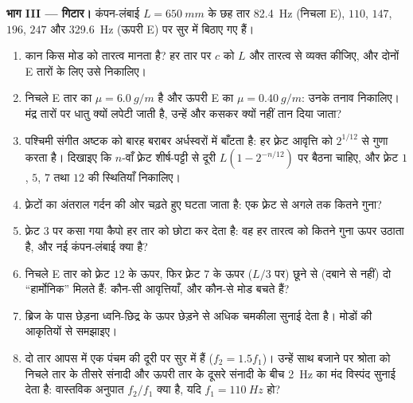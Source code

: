 \begin{problem}[{सप्ताहांत समस्या --- प्रयोग-मेज़ पर कंपित होता एक तार, एक
घिरनी और कुछ बाट, फिर एक गिटार: अर्ध-तरंगदैर्घ्यों की गिनती कैसे फ़्रेटबोर्ड
के हर स्वर को तय कर देती है}]
\medskip
\noindent\textbf{भाग III --- गिटार।}
कंपन-लंबाई $L = \qty{650}{mm}$ के छह तार
\qty{82.4}{Hz} (निचला E), $110$, $147$, $196$, $247$ और \qty{329.6}{Hz}
(ऊपरी E) पर सुर में बिठाए गए हैं।
\begin{enumerate}[resume]
  \item कान किस मोड को तारत्व मानता है? हर तार पर $c$ को $L$ और तारत्व
        से व्यक्त कीजिए, और दोनों E तारों के लिए उसे निकालिए।
  \item निचले E तार का $\mu = \qty{6.0}{g/m}$ है और ऊपरी E का
        $\mu = \qty{0.40}{g/m}$: उनके तनाव निकालिए। मंद्र तारों पर धातु
        क्यों लपेटी जाती है, उन्हें और कसकर क्यों नहीं तान दिया जाता?
  \item पश्चिमी संगीत अष्टक को बारह बराबर अर्धस्वरों में बाँटता है: हर
        फ़्रेट आवृत्ति को $2^{1/12}$ से गुणा करता है। दिखाइए कि
        $n$-वाँ फ़्रेट शीर्ष-पट्टी से दूरी $L(1 - 2^{-n/12})$ पर बैठना
        चाहिए, और फ़्रेट $1$, $5$, $7$ तथा $12$ की स्थितियाँ निकालिए।
  \item फ़्रेटों का अंतराल गर्दन की ओर चढ़ते हुए घटता जाता है: एक फ़्रेट से
        अगले तक कितने गुना?
  \item फ़्रेट $3$ पर कसा गया कैपो हर तार को छोटा कर देता है: वह हर तारत्व
        को कितने गुना ऊपर उठाता है, और नई कंपन-लंबाई क्या है?
  \item निचले E तार को फ़्रेट $12$ के ऊपर, फिर फ़्रेट $7$ के ऊपर ($L/3$
        पर) छूने से (दबाने से नहीं) दो ``हार्मोनिक'' मिलते हैं: कौन-सी
        आवृत्तियाँ, और कौन-से मोड बचते हैं?
  \item ब्रिज के पास छेड़ना ध्वनि-छिद्र के ऊपर छेड़ने से अधिक चमकीला सुनाई
        देता है। मोडों की आकृतियों से समझाइए।
  \item दो तार आपस में एक पंचम की दूरी पर सुर में हैं ($f_2 = 1.5f_1$)।
        उन्हें साथ बजाने पर श्रोता को निचले तार के तीसरे संनादी और ऊपरी
        तार के दूसरे संनादी के बीच \qty{2}{Hz} का मंद विस्पंद सुनाई देता
        है: वास्तविक अनुपात $f_2/f_1$ क्या है, यदि $f_1 = \qty{110}{Hz}$
        हो?
\end{enumerate}


\end{problem}
